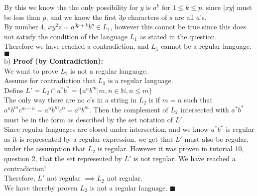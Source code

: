 \documentclass{article}
\newcommand{\N}{\mathbb{N}}
\begin{document}
\begin{enumerate}
  	By this we know the the only possibility for $y$ is $a^k$ for $1\leq k \leq p$, since $|xy|$ must be less than $p$, and we know the first $3p$ characters of $s$ are all $a$'s.\\
  	By number 4, $xy^2z = a^{3p + k}b^p \in L_1$, however this cannot be true since this does not satisfy the condition of the language $L_1$ as stated in the question.\\
  	Therefore we have reached a contradiction, and $L_1$ cannot be a regular language. \null\hfill $\blacksquare$ \\
  	
  	b) \textbf{Proof (by Contradiction):}\\
  	We want to prove $L_2$ is not a regular language. \\
  	Assume for contradiction that $L_2$ is a regular language. \\
  	
  	Define $L' = L_2 \cap a^*b^* = \{ a^n b^m | m,n \in \N, n \leq m\}$\\
  	
  	The only way there are no $c$'s in a string in $L_2$ is if $m = n$ such that $a^nb^mc^{m-n} = a^nb^mc^0 = a^nb^m$. Then the complement of $L_2$ intersected with $a^*b^*$ must be in the form as described by the set notation of $L'$. \\
  	
  	Since regular languages are closed under intersection, and we know $a^*b^*$ is regular as it is represented by a regular expression, we get that $L'$ must also be regular, under the assumption that $L_2$ is regular. However it was proven in tutorial 10, question 2, that the set represented by $L'$ is not regular. We have reached a contradiction! \\
  	
  	Therefore, $L'$ not regular $\implies L_2$ not regular. \\
  	
  	We have thereby proven $L_2$ is not a regular language. \null\hfill $\blacksquare$ \\
  
  
\end{enumerate}
\end{document}
